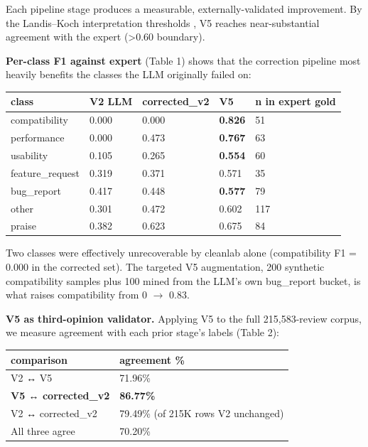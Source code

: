 \documentclass[sigconf, nonacm, anonymous, balance=false]{acmart}
\begin{document}
Each pipeline stage produces a measurable, externally-validated improvement. By the Landis--Koch interpretation thresholds \cite{landis1977}, V5 reaches near-substantial agreement with the expert (\textgreater0.60 boundary).

\textbf{Per-class F1 against expert} (Table 1) shows that the correction pipeline most heavily benefits the classes the LLM originally failed on:

\begin{table}[t]
\centering
\footnotesize
\setlength{\tabcolsep}{2pt}
\begin{tabular}{@{}lllll@{}}
\toprule
class & V2 LLM & corrected\_v2 & \textbf{V5} & n in expert gold \\
\midrule\bottomrule
compatibility & 0.000 & 0.000 & \textbf{0.826} & 51 \\
performance & 0.000 & 0.473 & \textbf{0.767} & 63 \\
usability & 0.105 & 0.265 & \textbf{0.554} & 60 \\
feature\_request & 0.319 & 0.371 & 0.571 & 35 \\
bug\_report & 0.417 & 0.448 & \textbf{0.577} & 79 \\
other & 0.301 & 0.472 & 0.602 & 117 \\
praise & 0.382 & 0.623 & 0.675 & 84 \\
\end{tabular}
\end{table}

Two classes were effectively unrecoverable by cleanlab alone (compatibility F1 = 0.000 in the corrected set). The targeted V5 augmentation, 200 synthetic compatibility samples plus 100 mined from the LLM's own bug\_report bucket, is what raises compatibility from 0 $\rightarrow$ 0.83.

\textbf{V5 as third-opinion validator.} Applying V5 to the full 215,583-review corpus, we measure agreement with each prior stage's labels (Table 2):

\begin{table}[t]
\centering
\footnotesize
\setlength{\tabcolsep}{2pt}
\begin{tabular}{@{}ll@{}}
\toprule
comparison & agreement \% \\
\midrule\bottomrule
V2 ↔ V5 & 71.96\% \\
\textbf{V5 ↔ corrected\_v2} & \textbf{86.77\%} \\
V2 ↔ corrected\_v2 & 79.49\% (of 215K rows V2 unchanged) \\
All three agree & 70.20\% \\
\end{tabular}
\end{table}
\end{document}
